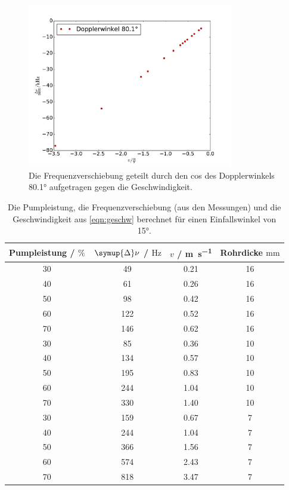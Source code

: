 \documentclass[
  bibliography=totoc,     %
  captions=tableheading,  %
  titlepage=firstiscover, %
]{scrartcl}
\begin{document}
\begin{figure}
    \centering
      \includegraphics[width=0.8\textwidth]{a15.pdf}
      \caption{Die Frequenzverschiebung geteilt durch den cos des
      Dopplerwinkels 80.1° aufgetragen gegen die Geschwindigkeit.}
      \label{fig:1}
  \end{figure}
 \begin{table}
    \centering
    \begin{tabular}{c c c c}
      \toprule
      {Pumpleistung / $\si{\percent}$} & {$\symup{\Delta} \nu$ / $\si{\hertz}$} & {$v$ /
      \si{\meter\per\second}} & {Rohrdicke $\si{\milli\meter}$} \\
      \midrule
      30 & 49 & 0.21  & 16\\
      40 & 61 & 0.26  & 16\\
      50 & 98 & 0.42  & 16\\
      60 & 122 & 0.52  & 16\\
      70 & 146 & 0.62  & 16\\
      30 & 85 & 0.36  & 10\\
      40 & 134 & 0.57  & 10\\
      50 & 195 & 0.83  & 10\\
      60 & 244 & 1.04 & 10\\
      70 & 330 & 1.40 & 10\\
      30 & 159 & 0.67  & 7\\
      40 & 244 & 1.04 & 7\\
      50 & 366 & 1.56 & 7\\
      60 & 574 & 2.43 & 7\\
      70 & 818 & 3.47 & 7\\
      \bottomrule
    \end{tabular}
    \caption{Die Pumpleistung, die Frequenzverschiebung (aus den Messungen) und
    die Geschwindigkeit aus \eqref{eqn:geschw} berechnet für einen Einfallswinkel
    von 15°.}
    \label{tab:2}
  \end{table}
\end{document}
